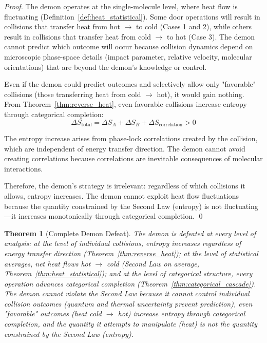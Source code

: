\documentclass[12pt,a4paper]{article}
\newtheorem{theorem}{Theorem}[section]
\theoremstyle{definition}
\theoremstyle{remark}
\begin{document}
\begin{proof}
The demon operates at the single-molecule level, where heat flow is fluctuating (Definition~\ref{def:heat_statistical}). Some door operations will result in collisions that transfer heat from hot $\to$ to cold (Cases 1 and 2), while others result in collisions that transfer heat from cold $\to$ to hot (Case 3). The demon cannot predict which outcome will occur because collision dynamics depend on microscopic phase-space details (impact parameter, relative velocity, molecular orientations) that are beyond the demon's knowledge or control.

Even if the demon could predict outcomes and selectively allow only "favorable" collisions (those transferring heat from cold $\to$ hot), it would gain nothing. From Theorem~\ref{thm:reverse_heat}, even favorable collisions increase entropy through categorical completion:
\begin{equation}
\Delta S_{\text{total}} = \Delta S_A + \Delta S_B + \Delta S_{\text{correlation}} > 0
\end{equation}

The entropy increase arises from phase-lock correlations created by the collision, which are independent of energy transfer direction. The demon cannot avoid creating correlations because correlations are inevitable consequences of molecular interactions.

Therefore, the demon's strategy is irrelevant: regardless of which collisions it allows, entropy increases. The demon cannot exploit heat flow fluctuations because the quantity constrained by the Second Law (entropy) is not fluctuating—it increases monotonically through categorical completion. \qed
\end{proof}

\begin{theorem}[Complete Demon Defeat]
\label{thm:complete_defeat}
The demon is defeated at every level of analysis: at the level of individual collisions, entropy increases regardless of energy transfer direction (Theorem~\ref{thm:reverse_heat}); at the level of statistical averages, net heat flows hot $\to$ cold (Second Law on average, Theorem~\ref{thm:heat_statistical}); and at the level of categorical structure, every operation advances categorical completion (Theorem~\ref{thm:categorical_cascade}). The demon cannot violate the Second Law because it cannot control individual collision outcomes (quantum and thermal uncertainty prevent prediction), even "favorable" outcomes (heat cold $\to$ hot) increase entropy through categorical completion, and the quantity it attempts to manipulate (heat) is not the quantity constrained by the Second Law (entropy).
\end{theorem}
\end{document}
